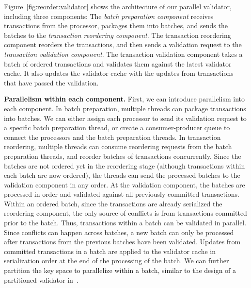 Figure~\ref{fig:reorder:validator} shows the architecture of our parallel validator, including three components: 
The \emph{batch preparation component} receives transactions from the processor, packages them into batches, and sends the batches to the \emph{transaction reordering component}. The transaction reordering component reorders the transactions, and then sends a validation request to the \emph{transaction validation component}. The transaction validation component takes a batch of ordered 
transactions
and validates them against the latest validator cache. It also updates the validator cache with the updates from transactions that have passed the validation. 

{\bf Parallelism within each component.}
First, we can introduce parallelism into each component. In batch preparation, multiple threads can package transactions into batches. We can either assign each processor to send its validation request to a specific batch preparation thread, or create a consumer-producer queue to connect the processors and the batch preparation threads. In transaction reordering, multiple threads can consume reordering requests from the batch preparation threads, and reorder batches of transactions concurrently. Since the batches are not ordered yet in the reordering stage (although transactions within each batch are now ordered), the threads can send the processed batches to the validation component in any order. At the validation component, the batches are processed in order and validated against all previously committed transactions. 
Within an ordered batch, since the transactions are already serialized the reordering component, the only source of conflicts is from  transactions committed prior to the batch. Thus, transactions within a batch can be validated in parallel. Since conflicts can happen across batches, a new batch can only be processed after transactions from the previous batches have been validated. Updates from committed transactions in a batch are applied to the validator cache in serialization order at the end of the processing of the batch. We can further partition the key space to parallelize within a batch, similar to the design of a partitioned validator in~\cite{ding2015centiman}.



